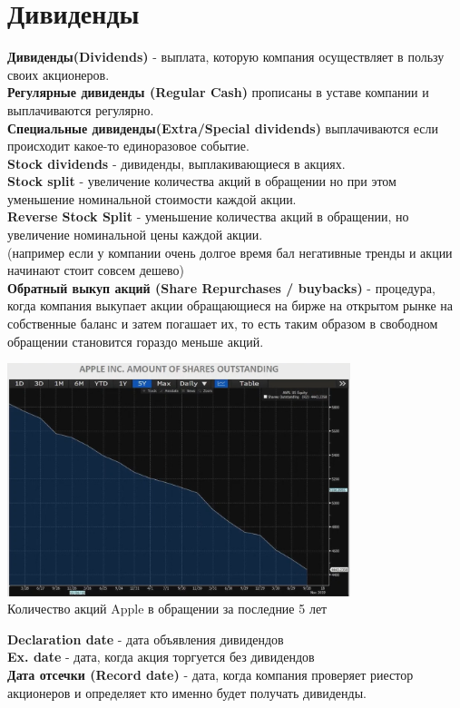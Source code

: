 \documentclass{article}
\begin{document}
\section{Дивиденды}
{\bf Дивиденды(Dividends)} - выплата, которую компания осуществляет в пользу своих акционеров.\\
{\bf Регулярные дивиденды (Regular Cash)} прописаны в уставе компании и выплачиваются регулярно.\\
{\bf Специальные дивиденды(Extra/Special dividends)} выплачиваются если происходит какое-то единоразовое событие.\\
{\bf Stock dividends} - дивиденды, выплакивающиеся в акциях.\\
{\bf Stock split} - увеличение количества акций в обращении но при этом уменьшение номинальной стоимости каждой акции.\\
{\bf Reverse Stock Split} - уменьшение количества акций в обращении, но увеличение номинальной цены каждой акции.\\
(например если у компании очень долгое время бал негативные тренды и акции начинают стоит совсем дешево)\\
{\bf Обратный выкуп акций (Share Repurchases / buybacks)} - процедура, когда компания выкупает акции обращающиеся на бирже на открытом рынке на собственные баланс и затем погашает их, то есть таким образом в свободном обращении становится гораздо меньше акций.\\
\begin{center}
\includegraphics[width=0.75\textwidth]{Apple.png}\\
{Количество акций Apple в обращении за последние 5 лет}
\end{center}
{\bf Declaration date} - дата объявления дивидендов\\
{\bf Ex. date} - дата, когда акция торгуется без дивидендов\\
{\bf Дата отсечки (Record date)} - дата, когда компания проверяет риестор акционеров и определяет кто именно будет получать дивиденды.\\
\end{document}
